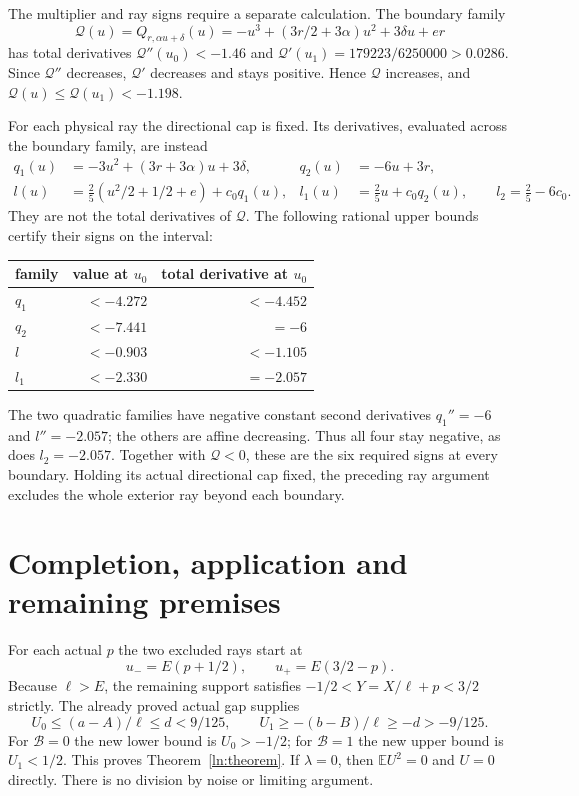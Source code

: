 \documentclass[11pt]{article}
\newcommand{\E}{\mathbb E}\newcommand{\Pp}{\mathbb P}
\begin{document}
The multiplier and ray signs require a separate calculation.
The boundary family
\[
 \mathcal Q(u)=Q_{r,\alpha u+\delta}(u)
 =-u^3+(3r/2+3\alpha)u^2+3\delta u+er
\]
has total derivatives $\mathcal Q''(u_0)<-1.46$ and
$\mathcal Q'(u_1)=179223/6250000>0.0286$.
Since $\mathcal Q''$ decreases, $\mathcal Q'$ decreases and stays
positive. Hence $\mathcal Q$ increases, and
$\mathcal Q(u)\le\mathcal Q(u_1)<-1.198$.

For each physical ray the directional cap is fixed. Its derivatives,
evaluated across the boundary family, are instead
\begin{align*}
 q_1(u)&=-3u^2+(3r+3\alpha)u+3\delta,&
 q_2(u)&=-6u+3r,\\
 l(u)&=\tfrac25(u^2/2+1/2+e)+c_0q_1(u),&
 l_1(u)&=\tfrac25u+c_0q_2(u),\qquad l_2=\tfrac25-6c_0.
\end{align*}
They are not the total derivatives of $\mathcal Q$.
The following rational upper bounds certify their signs on the interval:
\begin{center}
\begin{tabular}{lrr}\toprule
family & value at $u_0$ & total derivative at $u_0$\\\midrule
$q_1$ & $<-4.272$ & $<-4.452$\\
$q_2$ & $<-7.441$ & $=-6$\\
$l$   & $<-0.903$ & $<-1.105$\\
$l_1$ & $<-2.330$ & $=-2.057$\\\bottomrule
\end{tabular}
\end{center}
The two quadratic families have negative constant second derivatives
$q_1''=-6$ and $l''=-2.057$; the others are affine decreasing.
Thus all four stay negative, as does $l_2=-2.057$.
Together with $\mathcal Q<0$, these are the six required signs at every
boundary. Holding its actual directional cap fixed, the preceding ray
argument excludes the whole exterior ray beyond each boundary.

\section{Completion, application and remaining premises}
For each actual $p$ the two excluded rays start at
\[
 u_-=E(p+1/2),\qquad u_+=E(3/2-p).
\]
Because $\ell>E$, the remaining support satisfies
$-1/2<Y=X/\ell+p<3/2$ strictly. The already proved actual gap supplies
\[
 U_0\le(a-A)/\ell\le d<9/125,
 \qquad U_1\ge-(b-B)/\ell\ge-d>-9/125.
\]
For $\mathcal B=0$ the new lower bound is $U_0>-1/2$;
for $\mathcal B=1$ the new upper bound is $U_1<1/2$.
This proves Theorem~\ref{ln:theorem}. If $\lambda=0$, then $\E U^2=0$
and $U=0$ directly. There is no division by noise or limiting argument.
\end{document}
